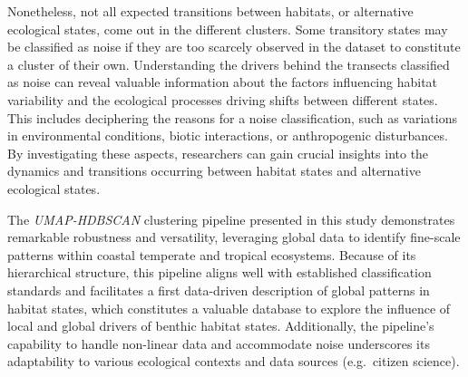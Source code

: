 \begin{refsection}
Nonetheless, not all expected transitions between habitats, or
alternative ecological states, come out in the different clusters. Some
transitory states may be classified as noise if they are too scarcely
observed in the dataset to constitute a cluster of their own.
Understanding the drivers behind the transects classified as noise can
reveal valuable information about the factors influencing habitat
variability and the ecological processes driving shifts between
different states. This includes deciphering the reasons for a noise
classification, such as variations in environmental conditions, biotic
interactions, or anthropogenic disturbances. By investigating these
aspects, researchers can gain crucial insights into the dynamics and
transitions occurring between habitat states and alternative ecological
states.

The \emph{UMAP-HDBSCAN} clustering pipeline presented in this study
demonstrates remarkable robustness and versatility, leveraging global
data to identify fine-scale patterns within coastal temperate and
tropical ecosystems. Because of its hierarchical structure, this
pipeline aligns well with established classification standards and
facilitates a first data-driven description of global patterns in
habitat states, which constitutes a valuable database to explore the
influence of local and global drivers of benthic habitat states.
Additionally, the pipeline's capability to handle non-linear data and
accommodate noise underscores its adaptability to various ecological
contexts and data sources (e.g.~citizen science).

\clearpage

\printbibliography[heading=subbibintoc, title={Bibliographie}]
\end{refsection}